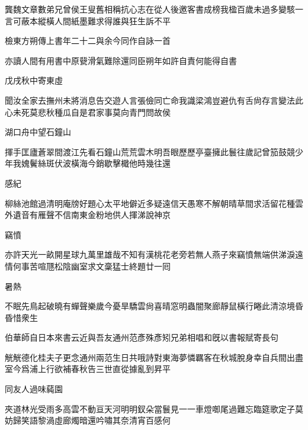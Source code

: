 \documentclass{zhvt-classic-Miya}
\begin{document}
龔魏文章數弟兄曾侯王叟舊相稱抗心志在從人後邀客書成榜我楹百歲未過多變駭一言可蔽本縱橫人間紙墨難求得誰與狂生訴不平

\begin{fw}檢東方朔傳上書年二十二與余今同作自詠一首\end{fw}

亦讀人間有用書中原㼱滑氣難除還同臣朔年如許自責何能得自書

\begin{fw}戊戌秋中寄東虛\end{fw}

聞汝全家去撫州未將消息告交遊人言張儉同亡命我識梁鴻豈避仇有舌尙存言變法此心未死莫悲秋種瓜自是君家事莫向青門問故侯

\begin{fw}湖口舟中望石鐘山\end{fw}

揮手匡廬蒼翠間渡江先看石鐘山荒荒雲木明吾眼歷歷亭臺擁此鬟往歲記曾笳鼓競少年我媿鬢絲斑伏波橫海今銷歇擊檝他時幾往還

\begin{fw}感紀\end{fw}

柳絲池館過清明庵牓好題心太平地僻近多疑遠信天愚寒不解朝晴草間求活留花種雲外遺音有雁聲不信南東金粉地供人揮涕說神京

\begin{fw}竊憤\end{fw}

亦許天光一畝開星球九萬里雄哉不知有漢桃花老旁若無人燕子來竊憤無端供涕淚遠情何事苦喧豗松陰幽室求文稾猛士終題廿一囘

\begin{fw}暑熱\end{fw}

不眠先鳥起破曉有蟬聲樂歲今憂旱驕雲尙喜晴窓明蟲闇聚廊靜鼠橫行睠此清涼境昏昏惜衆生

\begin{fw}伯華師自日本來書云近與吾友通州范彥殊彥矧兄弟相唱和旣以書報賦寄長句\end{fw}

觥觥德化桂夫子更念通州兩范生日共哦詩對東海夢憐羈客在秋城脫身幸自兵間出盡室今爲浦上行欲補春秋告三世直從據亂到昇平

\begin{fw}同友人過味蒓園\end{fw}

夾道林光受雨多高雲不動亘天河明明釵朵當鬟見一一車燈啣尾過難忘臨筵歌定子莫妨歸笑語黎渦虛廊燭暗還吟嘯其奈清宵百感何
\end{document}
